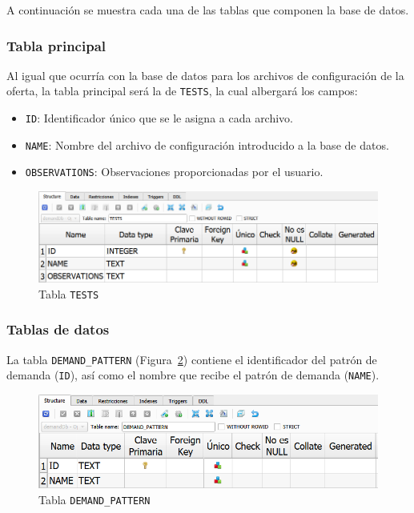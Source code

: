 A continuación se muestra cada una de las tablas que componen la base de datos.

\subsubsection{Tabla principal}

Al igual que ocurría con la base de datos para los archivos de configuración de la oferta, la tabla principal será la de \texttt{TESTS}, la cual albergará los campos:
\begin{itemize}
    \item \texttt{ID}: Identificador único que se le asigna a cada archivo.
    \item \texttt{NAME}: Nombre del archivo de configuración introducido a la base de datos.
    \item \texttt{OBSERVATIONS}: Observaciones proporcionadas por el usuario.
\end{itemize}

\begin{figure}[H]
\centering
\includegraphics[width=.9\textwidth]{fig/Tablas base de datos/Demanda/TESTS.png}
\caption{Tabla \texttt{TESTS}}
\label{fig:dbDemandTESTS}
\end{figure}

\subsubsection{Tablas de datos}

La tabla \texttt{DEMAND\_PATTERN} (Figura~\ref{fig:dbDemandDEMAND_PATTERN}) contiene el identificador del patrón de demanda (\texttt{ID}), así como el nombre que recibe el patrón de demanda (\texttt{NAME}). 

\begin{figure}[H]
\centering
\includegraphics[width=.9\textwidth]{fig/Tablas base de datos/Demanda/DEMAND_PATTERN.png}
\caption{Tabla \texttt{DEMAND\_PATTERN}}
\label{fig:dbDemandDEMAND_PATTERN}
\end{figure}

